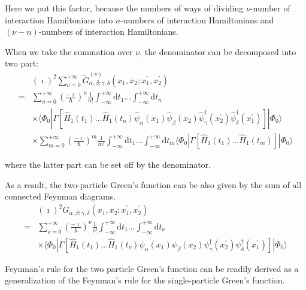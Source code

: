 Here we put this factor, because the numbers of ways of dividing $\nu$-number of interaction Hamiltonians into $n$-numbers of interaction Hamiltonians and $(\nu-n)$-numbers of interaction Hamiltonians.

When we take the summation over $\nu$, the denominator can be decomposed into two part:
\[ \begin{split} &(\imath)^2\sum_{\nu=0}^{+\infty}\tilde{G}^{(\nu)}_{\alpha,\beta;\gamma,\delta}(x_1,x_2;x_1^{'},x_2^{'}) \\
=& \sum_{n=0}^{+\infty}\left( \frac{-\imath}{\hbar} \right)^n \frac{1}{n!} \int_{-\infty}^{+\infty}\mathrm{d}t_1 \ldots \int_{-\infty}^{+\infty}\mathrm{d}t_n\\&\times
\langle \Phi_0 | \Gamma[\hat{H}_1(t_1)\ldots\hat{H}_1(t_n)\hat{\psi}_\alpha(x_1) \hat{\psi}_\beta(x_2) \hat{\psi}_\gamma^\dagger(x_2^{'}) \hat{\psi}_\delta^\dagger(x_1^{'})]|\Phi_0\rangle\\
&\times\sum_{m=0}^{+\infty}\left( \frac{-\imath}{\hbar} \right)^m \frac{1}{m!} \int_{-\infty}^{+\infty}\mathrm{d}t_1 \ldots \int_{-\infty}^{+\infty}\mathrm{d}t_m
\langle \Phi_0 | \Gamma[\hat{H}_1(t_1)\ldots\hat{H}_1(t_m)]|\Phi_0\rangle
\end{split} \]

where the latter part can be set off by the denominator.

As a result, the two-particle Green's function can be also given by the sum of all connected Feynman diagrams.
\[ \begin{split} &(\imath)^2 G_{\alpha,\beta;\gamma,\delta}(x_1,x_2;x_1^{'},x_2^{'}) \\
=& \sum_{\nu=0}^{+\infty}\left( \frac{-\imath}{\hbar} \right)^\nu \frac{1}{\nu!} \int_{-\infty}^{+\infty}\mathrm{d}t_1 \ldots \int_{-\infty}^{+\infty}\mathrm{d}t_\nu\\&\times
\langle \Phi_0 | \Gamma[\hat{H}_1(t_1)\ldots\hat{H}_1(t_\nu) \psi_\alpha(x_1) \psi_\beta(x_2) \psi_\gamma^\dagger(x_2^{'}) \psi_\delta^\dagger(x_1^{'})]|\Phi_0\rangle
\end{split} \]

Feynman's rule for the two particle Green's function can be readily derived as a generalization of the Feynman's rule for the single-particle Green's function.

